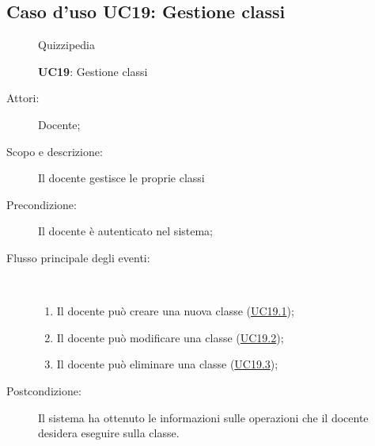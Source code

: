 \subsection{Caso d'uso UC19: Gestione classi}
\begin{figure}[H]
	\centering
	\begin{resizedtikzpicture}{\textwidth}
		\begin{umlsystem}[x=0, fill=lightgray!20]{Quizzipedia}
		\end{umlsystem}
	\end{resizedtikzpicture}
	\caption{\textbf{UC19}: Gestione classi}
	\label{UC19}
\end{figure}
\begin{description}
	\item[Attori:] Docente;
	\item[Scopo e descrizione:] Il docente gestisce le proprie classi
	\item[Precondizione:] Il docente è autenticato nel sistema;
	
	\item[Flusso principale degli eventi:] \ 
	\begin{enumerate}
		\item Il docente può creare una nuova classe (\hyperlink{UC19.1}{UC19.1});
		\item Il docente può modificare una classe (\hyperlink{UC19.2}{UC19.2});
		\item Il docente può eliminare una classe (\hyperlink{UC19.3}{UC19.3});
		
	\end{enumerate}
	\item[Postcondizione:] Il sistema ha ottenuto le informazioni sulle operazioni che il docente desidera eseguire sulla classe.
\end{description}
\hypertarget{UC19.1}{}
